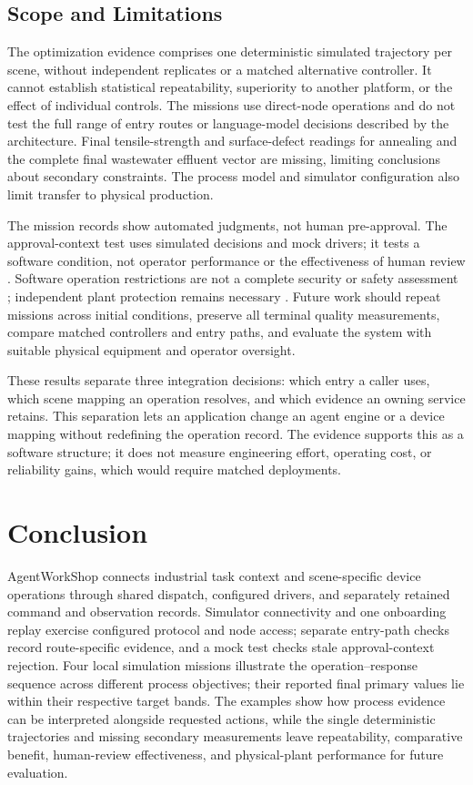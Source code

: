 \subsection{Scope and Limitations}
The optimization evidence comprises one deterministic simulated trajectory per scene,
without independent replicates or a matched alternative controller. It cannot
establish statistical repeatability, superiority to another platform, or the
effect of individual controls. The missions use direct-node operations and
do not test the full range of entry routes or language-model decisions
described by the architecture. Final tensile-strength and surface-defect
readings for annealing and the complete final wastewater effluent vector are
missing, limiting conclusions about secondary constraints. The process model
and simulator configuration also limit transfer to physical production.

The mission records show automated judgments, not human pre-approval. The
approval-context test uses simulated decisions and mock drivers; it tests a
software condition, not operator performance or the effectiveness of human
review \cite{parasuramanmanzey2010complacency,bainbridge1983ironies}.
Software operation restrictions are not a complete security or safety
assessment \cite{greshake2023injection,liu2024pinjection,iec62443-3-3};
independent plant protection remains necessary \cite{iec61511}. Future work
should repeat missions across initial conditions, preserve all terminal
quality measurements, compare matched controllers and entry paths, and
evaluate the system with suitable physical equipment and operator oversight.

These results separate three integration decisions: which entry a caller uses,
which scene mapping an operation resolves, and which evidence an owning service
retains. This separation lets an application change an agent engine or a device
mapping without redefining the operation record. The evidence supports this as
a software structure; it does not measure engineering effort, operating cost,
or reliability gains, which would require matched deployments.

\section{Conclusion}
\label{sec:conclusion}
AgentWorkShop connects industrial task context and scene-specific device
operations through shared dispatch, configured drivers, and separately
retained command and observation records. Simulator connectivity and one
onboarding replay exercise configured protocol and node access; separate
entry-path checks record route-specific evidence, and a mock test checks stale
approval-context rejection. Four local simulation missions
illustrate the operation--response sequence across different process
objectives; their reported final primary values lie within their respective
target bands. The examples show how process evidence can be interpreted
alongside requested actions, while the single deterministic trajectories and
missing secondary measurements leave repeatability, comparative benefit,
human-review effectiveness, and physical-plant performance for future
evaluation.

